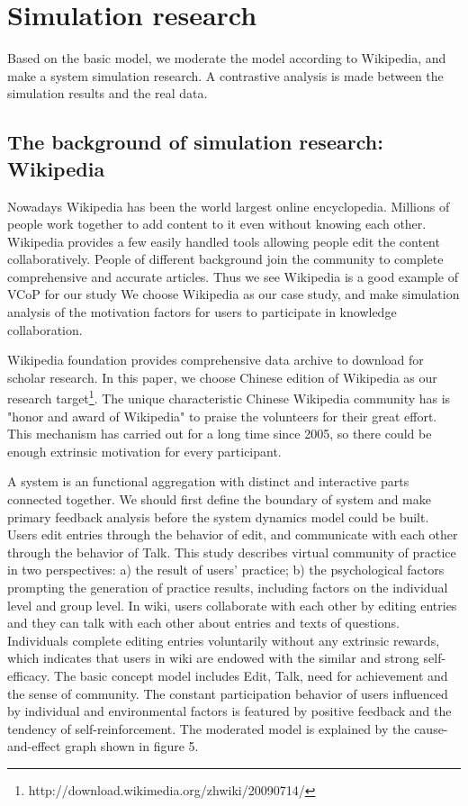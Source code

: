 \documentclass{elsarticle}
\begin{document}
\section{Simulation research }
\label{sec:simulation-research-}

 Based on the basic model, we moderate the model according to
    Wikipedia, and make a system simulation research. A contrastive
    analysis is made between the simulation results and the real
    data. 

\subsection{The background of simulation research: Wikipedia}
\label{sec:backgr-simul-rese}
Nowadays Wikipedia has been the world largest online
encyclopedia. Millions of people work together to add content to it
even without knowing each other. Wikipedia provides a few easily
handled tools allowing people edit the content collaboratively. People
of different background join the community to complete comprehensive
and accurate articles. Thus we see Wikipedia is a good example of VCoP
for our study 
  We choose Wikipedia as our case study, and make simulation analysis of the motivation factors for users to participate in knowledge collaboration. 

Wikipedia foundation provides comprehensive data archive to download
for scholar research. In this paper, we choose Chinese edition of
Wikipedia as our research
target\footnote{http://download.wikimedia.org/zhwiki/20090714/}. The
unique characteristic Chinese Wikipedia community has is "honor and
award of Wikipedia" to praise the volunteers for their great
effort. This mechanism  has carried out for a long time since 2005, so
there could be enough extrinsic motivation for every participant. 
   

A system is an functional aggregation with distinct and interactive parts connected together. We should first define the boundary of system and make primary feedback analysis before the system dynamics model could be built. Users edit entries through the behavior of edit, and communicate with each other through the behavior of Talk. This study describes virtual community of practice in two perspectives: a) the result of users’ practice; b) the psychological factors prompting the generation of practice results, including factors on the individual level and group level. In wiki, users collaborate with each other by editing entries and they can talk with each other about entries and texts of questions. Individuals complete editing entries voluntarily without any extrinsic rewards, which indicates that users in wiki are endowed with the similar and strong self-efficacy. The basic concept model includes Edit, Talk, need for achievement and the sense of community. The constant participation behavior of users influenced by individual and environmental factors is featured by positive feedback and the tendency of self-reinforcement. The moderated model is explained by the cause-and-effect graph shown in figure 5. 
\end{document}
